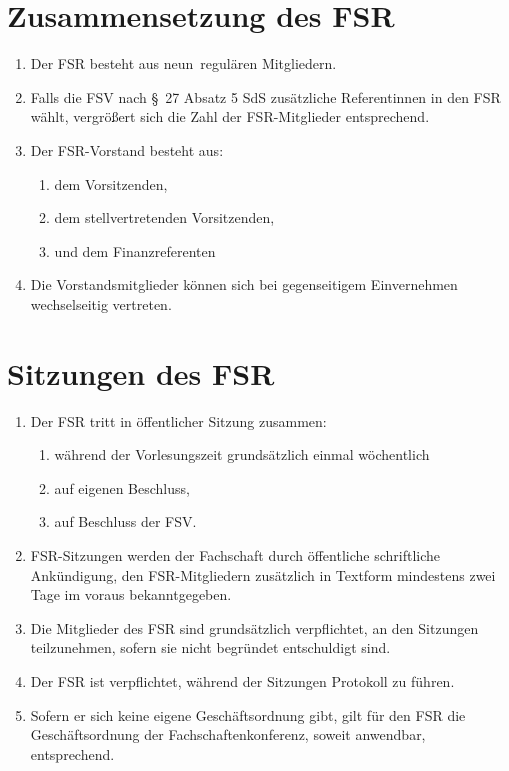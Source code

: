\documentclass{article}
\newcommand{\fsrgroesse}{neun}
\begin{document}
\section{Zusammensetzung des FSR}
\begin{enumerate}[(1)]
    \item Der FSR besteht aus \fsrgroesse\ regulären Mitgliedern.
    \item Falls die FSV nach §~27 Absatz 5 SdS zusätzliche Referentinnen in den FSR wählt, vergrößert sich die Zahl der FSR-Mitglieder entsprechend.
    \item Der FSR-Vorstand besteht aus:
	\begin{enumerate}[1.]
		\item dem Vorsitzenden,
		\item dem stellvertretenden Vorsitzenden,
		\item und dem Finanzreferenten
	\end{enumerate}
	\item Die Vorstandsmitglieder können sich bei gegenseitigem Einvernehmen wechselseitig vertreten.
\end{enumerate}

\section{Sitzungen des FSR}
\begin{enumerate}[(1)]
    \item Der FSR tritt in öffentlicher Sitzung zusammen:
    \begin{enumerate}[1.]
        \item während der Vorlesungszeit grundsätzlich einmal wöchentlich
        \item auf eigenen Beschluss,
        \item auf Beschluss der FSV.
    \end{enumerate}
    \item FSR-Sitzungen werden der Fachschaft durch öffentliche schriftliche Ankündigung, den FSR-Mitgliedern zusätzlich in Textform mindestens zwei Tage im voraus bekanntgegeben.
    \item Die Mitglieder des FSR sind grundsätzlich verpflichtet, an den Sitzungen teilzunehmen, sofern sie nicht begründet entschuldigt sind.
    \item Der FSR ist verpflichtet, während der Sitzungen Protokoll zu führen.
    \item Sofern er sich keine eigene Geschäftsordnung gibt, gilt für den FSR die Geschäftsordnung der Fachschaftenkonferenz, soweit anwendbar, entsprechend.
\end{enumerate}
\end{document}
